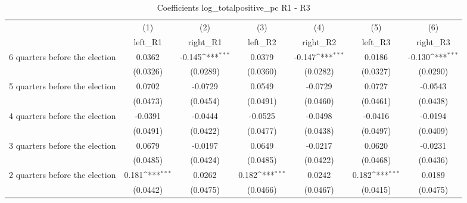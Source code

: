 \begin{table}[htbp]\centering
\def\sym#1{\ifmmode^{#1}\else\(^{#1}\)\fi}
\caption{Coefficients log\_totalpositive\_pc R1 - R3}
\begin{tabular}{l*{6}{c}}
\hline\hline
                    &\multicolumn{1}{c}{(1)}&\multicolumn{1}{c}{(2)}&\multicolumn{1}{c}{(3)}&\multicolumn{1}{c}{(4)}&\multicolumn{1}{c}{(5)}&\multicolumn{1}{c}{(6)}\\
                    &\multicolumn{1}{c}{left\_R1}&\multicolumn{1}{c}{right\_R1}&\multicolumn{1}{c}{left\_R2}&\multicolumn{1}{c}{right\_R2}&\multicolumn{1}{c}{left\_R3}&\multicolumn{1}{c}{right\_R3}\\
\hline
 6 quarters before the election&      0.0362         &      -0.145\sym{***}&      0.0379         &      -0.147\sym{***}&      0.0186         &      -0.130\sym{***}\\
                    &    (0.0326)         &    (0.0289)         &    (0.0360)         &    (0.0282)         &    (0.0327)         &    (0.0290)         \\
[1em]
 5 quarters before the election&      0.0702         &     -0.0729         &      0.0549         &     -0.0729         &      0.0727         &     -0.0543         \\
                    &    (0.0473)         &    (0.0454)         &    (0.0491)         &    (0.0460)         &    (0.0461)         &    (0.0438)         \\
[1em]
 4 quarters before the election&     -0.0391         &     -0.0444         &     -0.0525         &     -0.0498         &     -0.0416         &     -0.0194         \\
                    &    (0.0491)         &    (0.0422)         &    (0.0477)         &    (0.0438)         &    (0.0497)         &    (0.0409)         \\
[1em]
 3 quarters before the election&      0.0679         &     -0.0197         &      0.0649         &     -0.0217         &      0.0620         &     -0.0231         \\
                    &    (0.0485)         &    (0.0424)         &    (0.0485)         &    (0.0422)         &    (0.0468)         &    (0.0436)         \\
[1em]
 2 quarters before the election&       0.181\sym{***}&      0.0262         &       0.182\sym{***}&      0.0242         &       0.182\sym{***}&      0.0189         \\
                    &    (0.0442)         &    (0.0475)         &    (0.0466)         &    (0.0467)         &    (0.0415)         &    (0.0475)         \\

\end{tabular}
\end{table}
